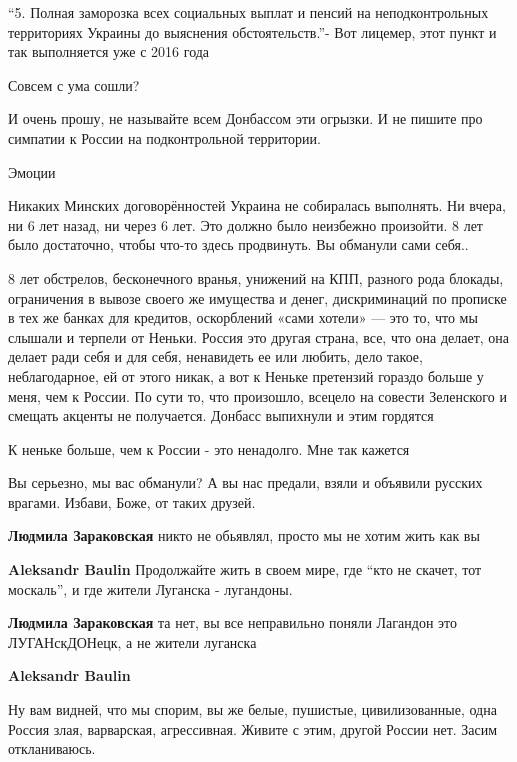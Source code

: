 \begin{itemize}
\enquote{5. Полная заморозка всех социальных выплат и пенсий на неподконтрольных
территориях Украины до выяснения обстоятельств.}- Вот лицемер, этот пункт и так
выполняется уже с 2016 года

Совсем с ума сошли?

И очень прошу, не называйте всем Донбассом эти огрызки. И не пишите про
симпатии к России на подконтрольной территории.

Эмоции


Никаких Минских договорённостей Украина не собиралась выполнять. Ни вчера, ни 6
лет назад, ни через 6 лет. Это должно было неизбежно произойти. 8 лет было
достаточно, чтобы что-то здесь продвинуть. Вы обманули сами себя..


8 лет обстрелов, бесконечного вранья, унижений на КПП, разного рода блокады,
ограничения в вывозе своего же имущества и денег, дискриминаций по прописке в
тех же банках для кредитов, оскорблений «сами хотели» — это то, что мы слышали
и терпели от Неньки. Россия это другая страна, все, что она делает, она делает
ради себя и для себя, ненавидеть ее или любить, дело такое, неблагодарное, ей
от этого никак, а вот к Неньке претензий гораздо больше у меня, чем к России.
По сути то, что произошло, всецело на совести Зеленского и смещать акценты не
получается. Донбасс выпихнули и этим гордятся

К неньке больше, чем к России - это ненадолго. Мне так кажется


Вы серьезно, мы вас обманули? А вы нас предали, взяли и объявили русских
врагами. Избави, Боже, от таких друзей.

\begin{itemize} %
\textbf{Людмила Зараковская} никто не обьявлял, просто мы не хотим жить как вы

\textbf{Aleksandr Baulin} Продолжайте жить в своем мире, где \enquote{кто не скачет, тот москаль}, и где жители Луганска - лугандоны.

\textbf{Людмила Зараковская} та нет, вы все неправильно поняли
Лагандон это ЛУГАНскДОНецк, а не жители луганска

\textbf{Aleksandr Baulin} 

Ну вам видней, что мы спорим, вы же белые, пушистые, цивилизованные, одна
Россия злая, варварская, агрессивная. Живите с этим, другой России нет. Засим
откланиваюсь.



\end{itemize}
\end{itemize}
